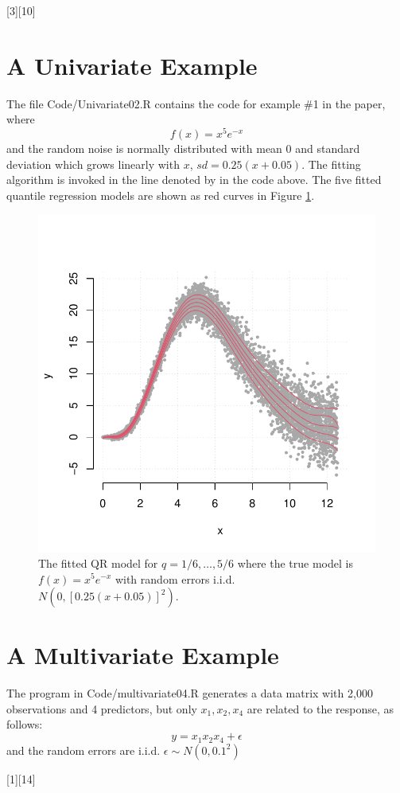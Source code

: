 \documentclass[a4paper,12pt]{article}
\newcommand{\dcircle}[1]{\ding{\numexpr181 + #1}}
\begin{document}
[3][10]

\section{A Univariate Example}
The file Code/Univariate02.R  contains the code for example \#1 in the paper, where $$f(x)=x^{5}e^{-x}$$ and the random noise is normally distributed with mean 0 and standard deviation which grows linearly with $x$, $sd=0.25(x+0.05)$.
The fitting algorithm is invoked in the line denoted by \small\dcircle{1} in the code above. The five fitted quantile regression models are shown as red curves in Figure \ref{Example1}.


\begin{figure}[b!]
\centering
\includegraphics[width=.5\linewidth]{Figures/Uni02.pdf}
\caption{The fitted QR model for $q=1/6,\ldots,5/6$ where the true model is $f(x)=x^{5}e^{-x}$ with random errors i.i.d. $N(0, [0.25(x+0.05)]^2)$.}\label{Example1}
\end{figure} 
 


\section{A Multivariate Example}
The program in Code/multivariate04.R generates a data matrix with 2,000 observations and 4 predictors, but only $x_1, x_2, x_4$ are related to the response, as follows:
$$y = x_1x_2x_4 + \epsilon$$
and the random errors are i.i.d. $\epsilon\sim N(0, 0.1^2)$

[1][14]
\end{document}
